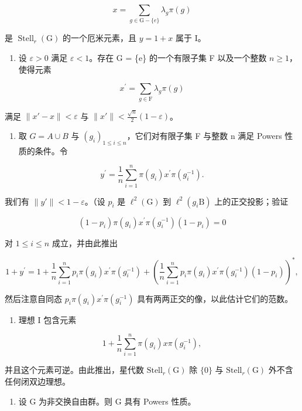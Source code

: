 \[
x = \sum_ {g \in \mathrm{G} - \{e \}} \lambda_ {g} \pi (g)
\]

是 \(\operatorname{Stell}_{r}(\mathrm{G})\) 的一个厄米元素，且 \(y = 1 + x\) 属于 I。

\begin{enumerate}
\def\labelenumi{\alph{enumi})}
\setcounter{enumi}{1}
\tightlist
\item
  设 \(\varepsilon > 0\) 满足 \(\varepsilon < 1\)。存在 G = \{e\} 的一个有限子集 F 以及一个整数 \(n \geqslant 1\)，使得元素
\end{enumerate}

\[
x ^ {\prime} = \sum_ {g \in \mathrm{F}} \lambda_ {g} \pi (g)
\]

满足 \(\|x' - x\| < \varepsilon\) 与 \(\|x'\| < \frac{\sqrt{n}}{2}(1 - \varepsilon)\)。

\begin{enumerate}
\def\labelenumi{\alph{enumi})}
\setcounter{enumi}{2}
\tightlist
\item
  取 \(G = A \cup B\) 与 \((g_{i})_{1 \leqslant i \leqslant n}\)，它们对有限子集 F 与整数 n 满足 Powers 性质的条件。令
\end{enumerate}

\[
y ^ {\prime} = \frac {1}{n} \sum_ {i = 1} ^ {n} \pi (g _ {i}) x ^ {\prime} \pi (g _ {i} ^ {- 1}).
\]

我们有 \(\|y'\| < 1 - \varepsilon\)。（设 \(p_i\) 是 \(\ell^{2}(\mathrm{G})\) 到 \(\ell^{2}(g_{i}\mathrm{B})\) 上的正交投影；验证

\[
(1 - p _ {i}) \pi (g _ {i}) x ^ {\prime} \pi (g _ {i} ^ {- 1}) (1 - p _ {i}) = 0
\]

对 \(1 \leqslant i \leqslant n\) 成立，并由此推出

\[
1 + y ^ {\prime} = 1 + \frac {1}{n} \sum_ {i = 1} ^ {n} p _ {i} \pi (g _ {i}) x ^ {\prime} \pi (g _ {i} ^ {- 1}) + \left(\frac {1}{n} \sum_ {i = 1} ^ {n} p _ {i} \pi (g _ {i}) x ^ {\prime} \pi (g _ {i} ^ {- 1}) (1 - p _ {i})\right) ^ {*},
\]

然后注意自同态 \(p_{i}\pi(g_{i})x^{\prime}\pi(g_{i}^{-1})\) 具有两两正交的像，以此估计它们的范数。

\begin{enumerate}
\def\labelenumi{\alph{enumi})}
\setcounter{enumi}{3}
\tightlist
\item
  理想 I 包含元素
\end{enumerate}

\[
1 + \frac {1}{n} \sum_ {i = 1} ^ {n} \pi (g _ {i}) x \pi (g _ {i} ^ {- 1}),
\]

并且这个元素可逆。由此推出，星代数 \(\text{Stell}_{r}(\text{G})\) 除 \(\{0\}\) 与 \(\text{Stell}_{r}(\text{G})\) 外不含任何闭双边理想。

\begin{enumerate}
\def\labelenumi{\alph{enumi})}
\setcounter{enumi}{4}
\tightlist
\item
  设 G 为非交换自由群。则 G 具有 Powers 性质。
\end{enumerate}
\relax{}
